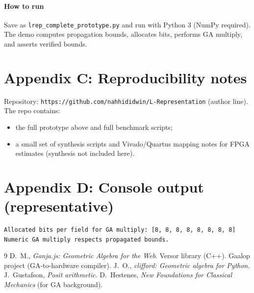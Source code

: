 \documentclass[11pt]{article}
\theoremstyle{definition}
\theoremstyle{plain}
\begin{document}
\paragraph{How to run} Save as \texttt{lrep_complete_prototype.py} and run with Python 3 (NumPy required). The demo computes propagation bounds, allocates bits, performs GA multiply, and asserts verified bounds.

\section{Appendix C: Reproducibility notes}
Repository: \texttt{https://github.com/nahhididwin/L-Representation} (author line). The repo contains:
\begin{itemize}
  \item the full prototype above and full benchmark scripts;
  \item a small set of synthesis scripts and Vivado/Quartus mapping notes for FPGA estimates (synthesis not included here).
\end{itemize}

\section{Appendix D: Console output (representative)}
\begin{verbatim}
Allocated bits per field for GA multiply: [8, 8, 8, 8, 8, 8, 8, 8]
Numeric GA multiply respects propagated bounds.
\end{verbatim}


\begin{thebibliography}{9}
 D.\ M., \emph{Ganja.js: Geometric Algebra for the Web}.
 Versor library (C++).
 Gaalop project (GA-to-hardware compiler).
 J.\ O., \emph{clifford: Geometric algebra for Python}.
 J.\ Gustafson, \emph{Posit arithmetic}.
 D.\ Hestenes, \emph{New Foundations for Classical Mechanics} (for GA background).
\end{thebibliography}
\end{document}
